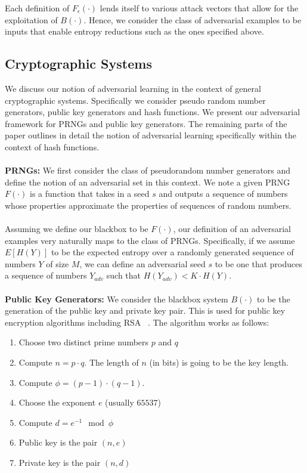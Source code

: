 \documentclass[letterpaper,twocolumn,10pt]{article}
\begin{document}
Each definition of $F_{\epsilon}(\cdot)$ lends itself to various attack vectors that allow for the exploitation of $B(\cdot)$. Hence, we consider the class of adversarial examples to be inputs that enable entropy reductions such as the ones specified above. 

\subsection{Cryptographic Systems}
We discuss our notion of adversarial learning in the context of general cryptographic systems. Specifically we consider pseudo random number generators, public key generators and hash functions. We present our adversarial framework for PRNGs and public key generators. The remaining parts of the paper outlines in detail the notion of adversarial learning specifically within the context of hash functions. 
\\
\\
\textbf{PRNGs:} We first consider the class of pseudorandom number generators and define the notion of an adversarial set in this context. We note a given PRNG $F(\cdot)$ is a function that takes in a seed $s$ and outputs a sequence of numbers whose properties approximate the properties of sequences of random numbers.
\\
\\
Assuming we define our blackbox to be $F(\cdot)$, our definition of an adversarial examples very naturally maps to the class of PRNGs. Specifically, if we assume $E[H(Y)]$ to be the expected entropy over a randomly generated sequence of numbers $Y$ of size $M$, we can define an adversarial seed $s$ to be one that produces a sequence of numbers $Y_{adv}$ such that $H(Y_{adv}) < K \cdot H(Y)$. 
\\
\\
\textbf{Public Key Generators:} We consider the blackbox system $B(\cdot)$ to be the generation of the public key and private key pair. This is used for public key encryption algorithms including RSA ~\cite{katz2014introduction}. The algorithm works as follows:

\begin{enumerate}
\item Choose two distinct prime numbers $p$ and $q$
\item Compute $n = p \cdot q$. The length of $n$ (in bits) is going to be the key length.
\item Compute $ \phi = (p-1) \cdot (q-1)$.
\item Choose the exponent $e$ (usually $65537$)
\item Compute $d = e^{-1} \mod \phi$
\item Public key is the pair $(n, e)$
\item Private key is the pair $(n, d)$
\end{enumerate}
\end{document}
